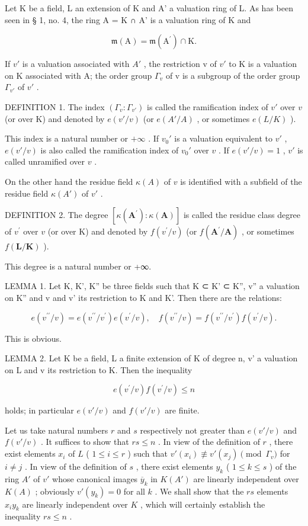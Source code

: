 Let K be a field, L an extension of K and A' a valuation ring of L. As has been seen in § 1, no. 4, the ring A = K ∩ A' is a valuation ring of K and

\[
\mathfrak {m} (\mathrm{A}) = \mathfrak {m} (\mathrm{A} ^ {\prime}) \cap \mathrm{K}.
\]

If \(v'\) is a valuation associated with \(A'\) , the restriction v of \(v'\) to K is a valuation on K associated with A; the order group \(\Gamma_{v}\) of v is a subgroup of the order group \(\Gamma_{v'}\) of \(v'\) .

DEFINITION 1. The index \((\Gamma_v: \Gamma_{v'})\) is called the ramification index of \(v'\) over \(v\) (or over K) and denoted by \(e(v'/v)\) (or \(e(A'/A)\) , or sometimes \(e(L/K)\) ).

This index is a natural number or \(+\infty\) . If \(v_0'\) is a valuation equivalent to \(v'\) , \(e(v'/v)\) is also called the ramification index of \(v_0'\) over \(v\) . If \(e(v'/v) = 1\) , \(v'\) is called unramified over \(v\) .

On the other hand the residue field \(\kappa(A)\) of \(v\) is identified with a subfield of the residue field \(\kappa(A')\) of \(v'\) .

DEFINITION 2. The degree \([\kappa (\mathbf{A}^{\prime}):\kappa (\mathbf{A})]\) is called the residue class degree of \(v^{\prime}\) over \(v\) (or over K) and denoted by \(f(v^{\prime} / v)\) (or \(f(\mathbf{A}^{\prime} / \mathbf{A})\) , or sometimes \(f(\mathbf{L} / \mathbf{K})\) ).

This degree is a natural number or +∞.

LEMMA 1. Let K, K', K'' be three fields such that K ⊂ K' ⊂ K'', v'' a valuation on K'' and v and v' its restriction to K and K'. Then there are the relations:

\[
e (v ^ {\prime \prime} / v) = e (v ^ {\prime \prime} / v ^ {\prime}) e (v ^ {\prime} / v), \quad f (v ^ {\prime \prime} / v) = f (v ^ {\prime \prime} / v ^ {\prime}) f (v ^ {\prime} / v).\tag{1}
\]

This is obvious.

LEMMA 2. Let K be a field, L a finite extension of K of degree n, v' a valuation on L and v its restriction to K. Then the inequality

\[
e (v ^ {\prime} / v) f (v ^ {\prime} / v) \leqslant n\tag{2}
\]

holds; in particular \(e(v' / v)\) and \(f(v' / v)\) are finite.

Let us take natural numbers \(r\) and \(s\) respectively not greater than \(e(v'/v)\) and \(f(v'/v)\) . It suffices to show that \(rs \leqslant n\) . In view of the definition of \(r\) , there exist elements \(x_i\) of \(L\) ( \(1 \leqslant i \leqslant r\) ) such that \(v'(x_i) \not\equiv v'(x_j) \pmod{\Gamma_v}\) for \(i \neq j\) . In view of the definition of \(s\) , there exist elements \(y_k\) ( \(1 \leqslant k \leqslant s\) ) of the ring \(A'\) of \(v'\) whose canonical images \(\overline{y}_k\) in \(K(A')\) are linearly independent over \(K(A)\) ; obviously \(v'(y_k) = 0\) for all \(k\) . We shall show that the \(rs\) elements \(x_i y_k\) are linearly independent over \(K\) , which will certainly establish the inequality \(rs \leqslant n\) .

